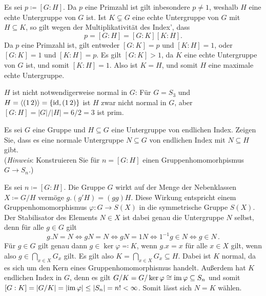 \begin{solution}
  Es sei $p \coloneqq [G : H]$.
  Da $p$ eine Primzahl ist gilt inbesondere $p \neq 1$, weshalb $H$ eine echte Untergruppe von $G$ ist.
  Ist $K \subsetneq G$ eine echte Untergruppe von $G$ mit $H \subseteq K$, so gilt wegen der Multiplikativität des Index’, dass 
  \[
      p
    = [G : H]
    = [G : K] [K : H].
  \]
  Da $p$ eine Primzahl ist, gilt entweder $[G : K] = p$ und $[K : H] = 1$, oder $[G : K] = 1$ und $[K : H] = p$.
  Es gilt $[G : K] > 1$, da $K$ eine echte Untergruppe von $G$ ist, und somit $[K : H] = 1$.
  Also ist $K = H$, und somit $H$ eine maximale echte Untergruppe.
  
  $H$ ist nicht notwendigerweise normal in $G$:
  Für $G = S_3$ und $H = \langle(1\,2)\rangle = \{\operatorname{id}, (1\,2)\}$ ist $H$ zwar nicht normal in $G$, aber $[G : H] = |G|/|H| = 6/2 = 3$ ist prim.
\end{solution}


\begin{question}[subtitle = {Untergruppen vom endlichen Index}]
  Es sei $G$ eine Gruppe und $H \subseteq G$ eine Untergruppe von endlichen Index.
  Zeigen Sie, dass es eine normale Untergruppe $N \subseteq G$ von endlichen Index mit $N \subseteq H$ gibt. \\
  (\emph{Hinweis}: Konstruieren Sie für $n = [G : H]$ einen Gruppenhomomorhpismus $G \to S_n$.)
\end{question}


\begin{solution}
  Es sei $n \coloneqq [G : H]$.
  Die Gruppe $G$ wirkt auf der Menge der Nebenklassen $X \coloneqq G/H$ vermöge $g.(g'H) = (gg)H$.
  Diese Wirkung entspricht einem Gruppenhomomorphismus $\varphi \colon G \to S(X)$ in die symmetrische Gruppe $S(X)$.
  Der Stabilisator des Elements $N \in X$ ist dabei genau die Untergruppe $N$ selbst, denn für alle $g \in G$ gilt
  \[
          g.N = N
    \iff  gN = N
    \iff  gN = 1N
    \iff  1^{-1} g \in N
    \iff  g \in N \,.
  \]
  Für $g \in G$ gilt genau dann $g \in \ker \varphi \eqqcolon K$, wenn $g.x = x$ für alle $x \in X$ gilt, wenn also $g \in \bigcap_{x \in X} G_x$ gilt.
  Es gilt also $K = \bigcap_{x \in X} G_x \subseteq H$.
  Dabei ist $K$ normal, da es sich um den Kern eines Gruppenhomomorphismus handelt.
  Außerdem hat $K$ endlichen Index in $G$, denn es gilt $G/K = G/\ker \varphi \cong \operatorname{im} \varphi \subseteq S_n$ und somit $[G : K] = |G/K| = |{\operatorname{im} \varphi}| \leq |S_n| = n! < \infty$.
  Somit lässt sich $N = K$ wählen.
\end{solution}


